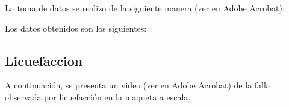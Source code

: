 La toma de datos se realizo de la siguiente manera (ver en Adobe Acrobat):

\begin{center}
\end{center}



Los datos obtenidos son los siguientes:


\subsection{Licuefaccion}

A continuación, se presenta un video (ver en Adobe Acrobat) de la falla observada por licuefacción en la maqueta a escala.

